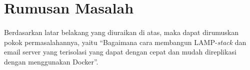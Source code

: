 \documentclass[./bab_1.tex]{subfiles}
\begin{document}
  \section{Rumusan Masalah}
  \paragraph*{}Berdasarkan latar belakang yang diuraikan di
  atas, maka dapat dirumuskan pokok
  permasalahannya, yaitu ``Bagaimana cara membangun
  LAMP-\textit{stack} dan email server yang terisolasi yang
  dapat dengan cepat dan mudah direplikasi dengan menggunakan
  Docker''.
\end{document}
